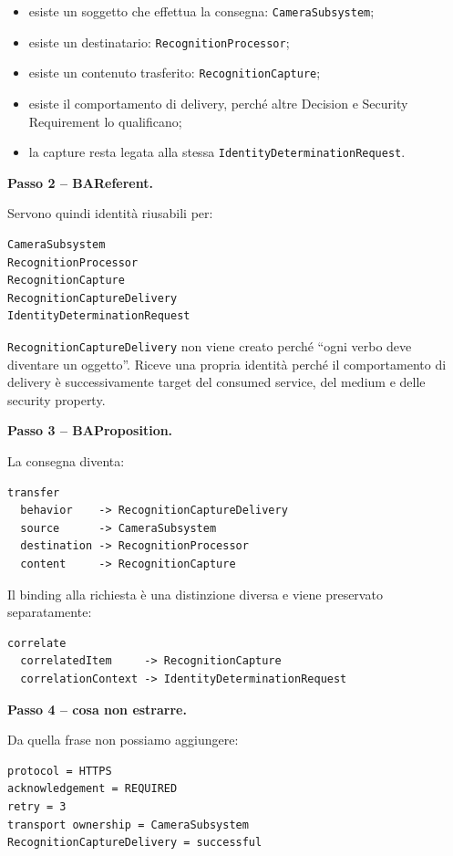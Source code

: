 \documentclass[11pt,a4paper]{article}
\newcommand{\code}[1]{\nolinkurl{#1}}
\begin{document}
\begin{itemize}
\item esiste un soggetto che effettua la consegna: \code{CameraSubsystem};
\item esiste un destinatario: \code{RecognitionProcessor};
\item esiste un contenuto trasferito: \code{RecognitionCapture};
\item esiste il comportamento di delivery, perché altre Decision e Security Requirement lo qualificano;
\item la capture resta legata alla stessa \code{IdentityDeterminationRequest}.
\end{itemize}

\textbf{Passo 2 -- BAReferent.}

Servono quindi identità riusabili per:

\begin{lstlisting}
CameraSubsystem
RecognitionProcessor
RecognitionCapture
RecognitionCaptureDelivery
IdentityDeterminationRequest
\end{lstlisting}

\code{RecognitionCaptureDelivery} non viene creato perché ``ogni verbo deve diventare un oggetto''. Riceve una propria identità perché il comportamento di delivery è successivamente target del consumed service, del medium e delle security property.

\textbf{Passo 3 -- BAProposition.}

La consegna diventa:

\begin{lstlisting}
transfer
  behavior    -> RecognitionCaptureDelivery
  source      -> CameraSubsystem
  destination -> RecognitionProcessor
  content     -> RecognitionCapture
\end{lstlisting}

Il binding alla richiesta è una distinzione diversa e viene preservato separatamente:

\begin{lstlisting}
correlate
  correlatedItem     -> RecognitionCapture
  correlationContext -> IdentityDeterminationRequest
\end{lstlisting}

\textbf{Passo 4 -- cosa non estrarre.}

Da quella frase non possiamo aggiungere:

\begin{lstlisting}
protocol = HTTPS
acknowledgement = REQUIRED
retry = 3
transport ownership = CameraSubsystem
RecognitionCaptureDelivery = successful
\end{lstlisting}
\end{document}

